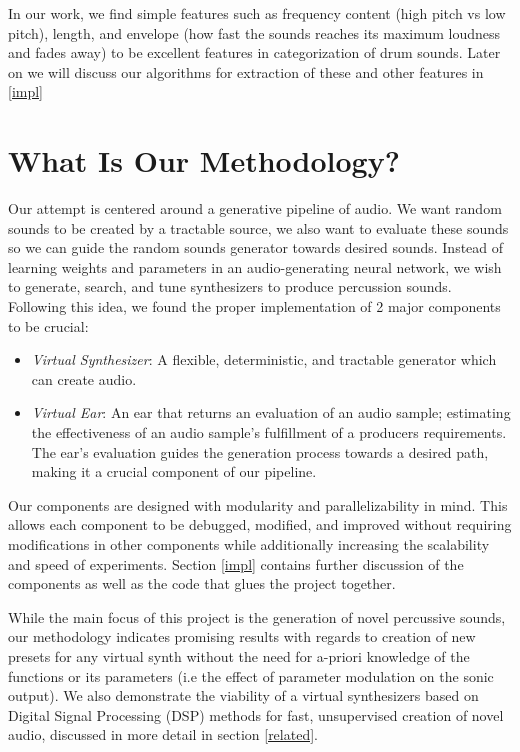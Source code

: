 \documentclass[\main/thesis.tex]{subfiles}
\begin{document}
In our work, we find simple features such as frequency content (high pitch vs low pitch), length, and envelope (how fast the sounds reaches its maximum loudness and fades away) to be excellent features in categorization of drum sounds. Later on we will discuss our algorithms for extraction of these and other features in \ref{impl}

\section{What Is Our Methodology?}

Our attempt is centered around a generative pipeline of audio. We want random sounds to be created by a tractable source, we also want to evaluate these sounds so we can guide the random sounds generator towards desired sounds. Instead of learning weights and parameters in an audio-generating neural network, we wish to generate, search, and tune synthesizers to produce percussion sounds. Following this idea, we found the proper implementation of 2 major components to be crucial:

\begin{itemize}
    \item \textit{Virtual Synthesizer}: A flexible, deter\-min\-istic, and tract\-able gener\-ator which can create audio. 
    \item \textit{Virtual Ear}: An ear that returns an evaluation of an audio sample; estimating the effectiveness of an audio sample's fulfillment of a producers requirements. The ear's evaluation guides the generation process towards a desired path, making it a crucial component of our pipeline. 
\end{itemize}
Our components are designed with modularity and parallelizability in mind. This allows each component to be debugged, modified, and improved without requiring modifications in other components while additionally increasing the scalability and speed of experiments. 
Section \ref{impl} contains further discussion of the components as well as the code that glues the project together.

While the main focus of this project is the generation of novel percussive sounds, our methodology indicates promising results with regards to creation of new presets for any virtual synth without the need for a-priori knowledge of the functions or its parameters (i.e the effect of parameter modulation on the sonic output). We also demonstrate the viability of a virtual synthesizers based on Digital Signal Processing (DSP) methods for fast, unsupervised creation of novel audio, discussed in more detail in section \ref{related}. 
\end{document}
